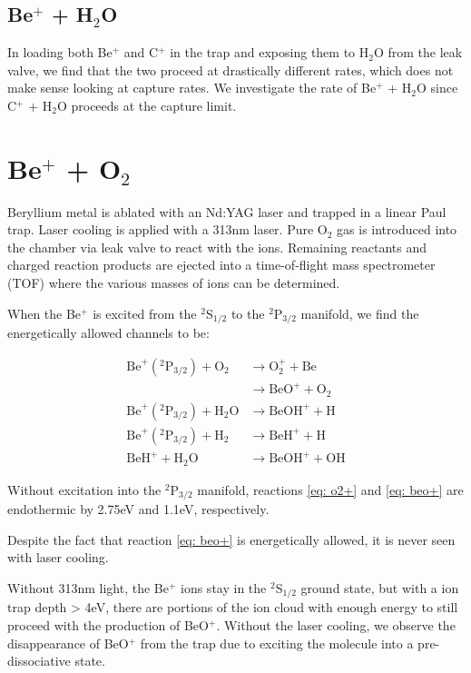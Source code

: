 \documentclass[a4paper]{article}
\begin{document}
\subsection{Be$^+$ + H$_2$O}

In loading both Be$^+$ and C$^+$ in the trap and exposing them to H$_2$O from the leak valve, we find that the two proceed at drastically different rates, which does not make sense looking at capture rates. We investigate the rate of Be$^+$ + H$_2$O since C$^+$ + H$_2$O proceeds at the capture limit.

\section{Be$^+$ + O$_2$}
Beryllium metal is ablated with an Nd:YAG laser and trapped in a linear Paul trap. Laser cooling is applied with a 313nm laser. Pure O$_2$ gas is introduced into the chamber via leak valve to react with the ions. Remaining reactants and charged reaction products are ejected into a time-of-flight mass spectrometer (TOF) where the various masses of ions can be determined.

When the Be$^+$ is excited from the $^2$S$_{1/2}$ to the $^2$P$_{3/2}$ manifold, we find the energetically allowed channels to be:

\begin{align}
    \text{Be}^+(^2\text{P}_{3/2}) + \text{O}_2 & \to \text{O}_2^+ + \text{Be} \label{eq: o2+} \\
    & \to \text{BeO}^+ + \text{O}_2 \label{eq: beo+} \\
    \text{Be}^+(^2\text{P}_{3/2}) + \text{H$_2$O} & \to \text{BeOH}^+ + \text{H} \\
    \text{Be}^+(^2\text{P}_{3/2}) + \text{H}_2 & \to \text{BeH}^+ + \text{H} \\
    \text{BeH}^+ + \text{H$_2$O} & \to \text{BeOH}^+ + \text{OH}
\end{align}

Without excitation into the $^2$P$_{3/2}$ manifold, reactions \ref{eq: o2+} and \ref{eq: beo+} are endothermic by 2.75eV and 1.1eV, respectively. 

Despite the fact that reaction \ref{eq: beo+} is energetically allowed, it is never seen with laser cooling.

Without 313nm light, the Be$^+$ ions stay in the $^2$S$_{1/2}$ ground state, but with a ion trap depth > 4eV, there are portions of the ion cloud with enough energy to still proceed with the production of BeO$^+$. Without the laser cooling, we observe the disappearance of BeO$^+$ from the trap due to exciting the molecule into a pre-dissociative state.
\end{document}
